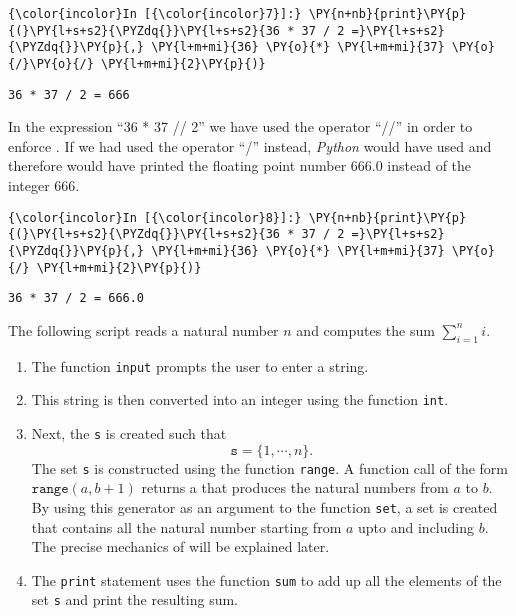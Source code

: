     \begin{Verbatim}[commandchars=\\\{\}]
{\color{incolor}In [{\color{incolor}7}]:} \PY{n+nb}{print}\PY{p}{(}\PY{l+s+s2}{\PYZdq{}}\PY{l+s+s2}{36 * 37 / 2 =}\PY{l+s+s2}{\PYZdq{}}\PY{p}{,} \PY{l+m+mi}{36} \PY{o}{*} \PY{l+m+mi}{37} \PY{o}{/}\PY{o}{/} \PY{l+m+mi}{2}\PY{p}{)}
\end{Verbatim}

\begin{Verbatim}[commandchars=\\\{\}]
36 * 37 / 2 = 666
\end{Verbatim}

In the expression ``36 * 37 // 2'' we have used the operator ``//'' in order
to enforce .  
If we had used the operator ``/''
instead, \textsl{Python} would have used 
and therefore would have printed the floating point number 666.0 instead
of the integer 666.

\begin{Verbatim}[commandchars=\\\{\}]
{\color{incolor}In [{\color{incolor}8}]:} \PY{n+nb}{print}\PY{p}{(}\PY{l+s+s2}{\PYZdq{}}\PY{l+s+s2}{36 * 37 / 2 =}\PY{l+s+s2}{\PYZdq{}}\PY{p}{,} \PY{l+m+mi}{36} \PY{o}{*} \PY{l+m+mi}{37} \PY{o}{/} \PY{l+m+mi}{2}\PY{p}{)}
\end{Verbatim}

\begin{Verbatim}[commandchars=\\\{\}]
36 * 37 / 2 = 666.0
\end{Verbatim}

\noindent
The following script reads a natural number \(n\) and computes the sum
\(\sum\limits_{i=1}^n i\).
\begin{enumerate}
\item The function \texttt{input} prompts the user to enter a string.
\item This string is then converted into an integer using the function \texttt{int}.
\item Next, the  \texttt{s} is created such that 
      $$\texttt{s} = \{1, \cdots, n\}. $$  
      The set \texttt{s} is constructed using the function \texttt{range}.  A function call 
      of the form $\texttt{range}(a, b + 1)$ returns a  
      that produces the natural numbers 
      from $a$ to $b$.  By using this generator as an argument to the function \texttt{set}, a set is created 
      that contains all the natural number starting from $a$ upto and including $b$.
      The precise mechanics of  will be explained later.
\item The \texttt{print} statement uses the function \texttt{sum} to add up all the elements of the
      set \texttt{s} and print the resulting sum.
\end{enumerate}

